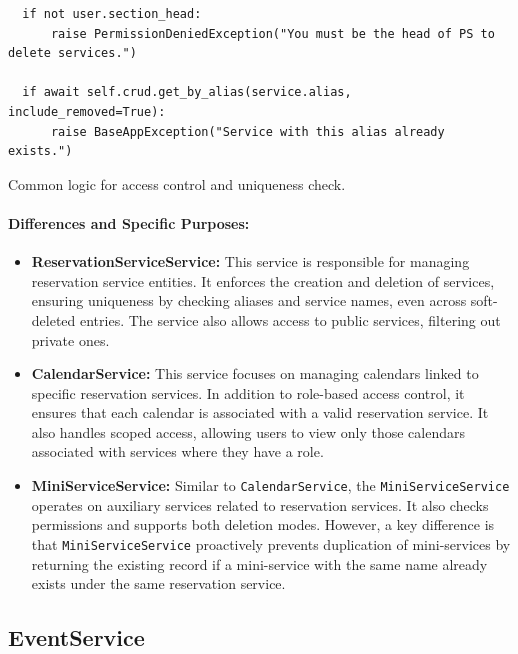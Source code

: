 \begin{listing}
  \begin{verbatim}
  if not user.section_head:
      raise PermissionDeniedException("You must be the head of PS to delete services.")
      
  if await self.crud.get_by_alias(service.alias, include_removed=True):
      raise BaseAppException("Service with this alias already exists.")
  \end{verbatim}
  \caption{Common logic for access control and uniqueness check.}
  \label{list:common_logic_checks}
\end{listing}

\paragraph{Differences and Specific Purposes:}

\begin{itemize}
  \item \textbf{ReservationServiceService:} This service is responsible for managing reservation service entities. It enforces the creation and deletion of services, ensuring uniqueness by checking aliases and service names, even across soft-deleted entries. The service also allows access to public services, filtering out private ones.
  
  \item \textbf{CalendarService:} This service focuses on managing calendars linked to specific reservation services. In addition to role-based access control, it ensures that each calendar is associated with a valid reservation service. It also handles scoped access, allowing users to view only those calendars associated with services where they have a role.
  
  \item \textbf{MiniServiceService:} Similar to \texttt{CalendarService}, the \texttt{MiniService\-Service} operates on auxiliary services related to reservation services. It also checks permissions and supports both deletion modes. However, a key difference is that \texttt{MiniServiceService} proactively prevents duplication of mini-services by returning the existing record if a mini-service with the same name already exists under the same reservation service.

\end{itemize}

\subsection{EventService}

